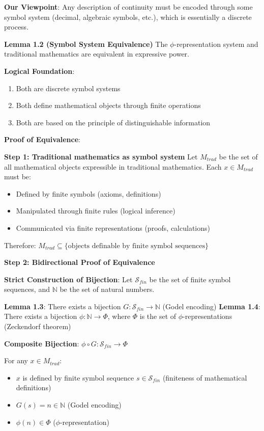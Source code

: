 \textbf{Our Viewpoint}: Any description of continuity must be encoded through some symbol system (decimal, algebraic symbols, etc.), which is essentially a discrete process.

\textbf{Lemma 1.2 (Symbol System Equivalence)}
\label{lem:1.2}
The $\phi$-representation system and traditional mathematics are equivalent in expressive power.

\textbf{Logical Foundation}:
\begin{enumerate}
\item Both are discrete symbol systems
\item Both define mathematical objects through finite operations
\item Both are based on the principle of distinguishable information
\end{enumerate}

\textbf{Proof of Equivalence}:

\textbf{Step 1: Traditional mathematics as symbol system}
Let $M_{trad}$ be the set of all mathematical objects expressible in traditional mathematics.
Each $x \in M_{trad}$ must be:
\begin{itemize}
\item Defined by finite symbols (axioms, definitions)
\item Manipulated through finite rules (logical inference)
\item Communicated via finite representations (proofs, calculations)
\end{itemize}

Therefore: $M_{trad} \subseteq \{\text{objects definable by finite symbol sequences}\}$

\textbf{Step 2: Bidirectional Proof of Equivalence}

\textbf{Strict Construction of Bijection}:
Let $\mathcal{S}_{fin}$ be the set of finite symbol sequences, and $\mathbb{N}$ be the set of natural numbers.

\textbf{Lemma 1.3}: There exists a bijection $G: \mathcal{S}_{fin} \to \mathbb{N}$ (Godel encoding)
\label{lem:1.3}
\textbf{Lemma 1.4}: There exists a bijection $\phi: \mathbb{N} \to \Phi$, where $\Phi$ is the set of $\phi$-representations (Zeckendorf theorem)
\label{lem:1.4}

\textbf{Composite Bijection}: $\phi \circ G: \mathcal{S}_{fin} \to \Phi$

For any $x \in M_{trad}$:
\begin{itemize}
\item $x$ is defined by finite symbol sequence $s \in \mathcal{S}_{fin}$ (finiteness of mathematical definitions)
\item $G(s) = n \in \mathbb{N}$ (Godel encoding)
\item $\phi(n) \in \Phi$ ($\phi$-representation)
\end{itemize}

